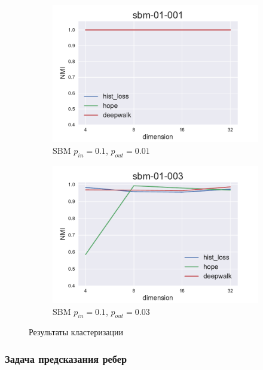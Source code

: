 \documentclass[12pt,a4paper]{extarticle}
\begin{document}
\begin{figure}
\begin{subfigure}{.5\linewidth}
    \includegraphics[width=\linewidth]{src/images/Node_clusterization_sbm-01-001.pdf}
    \caption{SBM $p_{in}=0.1$, $p_{out}=0.01$}
    \label{fig:clus_sbm1}
    \end{subfigure}
    \begin{subfigure}{.5\linewidth}
    \centering
    \includegraphics[width=\linewidth]{src/images/Node_clusterization_sbm-01-003.pdf}
    \caption{SBM $p_{in}=0.1$, $p_{out}=0.03$}
    \label{fig:clus_sbm2}
    \end{subfigure}
    \caption{Результаты кластеризации}
    \label{fig:clus}
    \end{figure}
    
    \subsubsection{Задача предсказания ребер}
\end{document}
